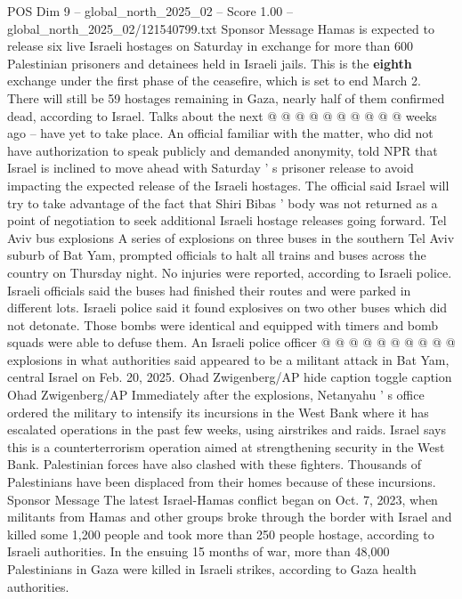 \begin{textsample}{POS Dim 9 – global\_north\_2025\_02 – Score 1.00 – global\_north\_2025\_02/121540799.txt}
Sponsor Message Hamas is expected to release six live Israeli hostages on Saturday in exchange for more than 600 Palestinian prisoners and detainees held in Israeli jails.
This is the \textbf{eighth} exchange under the first phase of the ceasefire, which is set to end March 2.
There will still be 59 hostages remaining in Gaza, nearly half of them confirmed dead, according to Israel.
Talks about the next @ @ @ @ @ @ @ @ @ @ weeks ago -- have yet to take place.
An official familiar with the matter, who did not have authorization to speak publicly and demanded anonymity, told NPR that Israel is inclined to move ahead with Saturday ' s prisoner release to avoid impacting the expected release of the Israeli hostages.
The official said Israel will try to take advantage of the fact that Shiri Bibas ' body was not returned as a point of negotiation to seek additional Israeli hostage releases going forward.
Tel Aviv bus explosions A series of explosions on three buses in the southern Tel Aviv suburb of Bat Yam, prompted officials to halt all trains and buses across the country on Thursday night.
No injuries were reported, according to Israeli police.
Israeli officials said the buses had finished their routes and were parked in different lots.
Israeli police said it found explosives on two other buses which did not detonate.
Those bombs were identical and equipped with timers and bomb squads were able to defuse them.
An Israeli police officer @ @ @ @ @ @ @ @ @ @ explosions in what authorities said appeared to be a militant attack in Bat Yam, central Israel on Feb. 20, 2025.
Ohad Zwigenberg/AP hide caption toggle caption Ohad Zwigenberg/AP Immediately after the explosions, Netanyahu ' s office ordered the military to intensify its incursions in the West Bank where it has escalated operations in the past few weeks, using airstrikes and raids.
Israel says this is a counterterrorism operation aimed at strengthening security in the West Bank.
Palestinian forces have also clashed with these fighters.
Thousands of Palestinians have been displaced from their homes because of these incursions.
Sponsor Message The latest Israel-Hamas conflict began on Oct. 7, 2023, when militants from Hamas and other groups broke through the border with Israel and killed some 1,200 people and took more than 250 people hostage, according to Israeli authorities.
In the ensuing 15 months of war, more than 48,000 Palestinians in Gaza were killed in Israeli strikes, according to Gaza health authorities.

\end{textsample}
